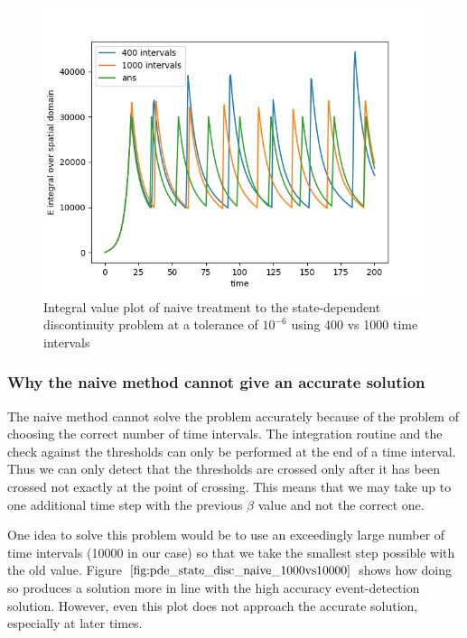 \documentclass{article}
\begin{document}
\begin{figure}[H]
\centering
\includegraphics[width=0.7\linewidth]{./figures/pde_state_disc_naive_400vs1000}
\caption{Integral value plot of naive treatment to the state-dependent discontinuity problem at a tolerance of $10^{-6}$ using 400 vs 1000 time intervals}
\label{fig:pde_state_disc_naive_400vs1000}
\end{figure}

\subsubsection{Why the naive method cannot give an accurate solution}
\label{subsubsection:pde_state_naive_always_inaccurate}
The naive method cannot solve the problem accurately because of the problem of choosing the correct number of time intervals. The integration routine and the check against the thresholds can only be performed at the end of a time interval. Thus we can only detect that the thresholds are crossed only after it has been crossed not exactly at the point of crossing. This means that we may take up to one additional time step with the previous $\beta$ value and not the correct one.

One idea to solve this problem would be to use an exceedingly large number of time intervals (10000 in our case) so that we take the smallest step possible with the old value. Figure $\ref{fig:pde_state_disc_naive_1000vs10000}$ shows how doing so produces a solution more in line with the high accuracy event-detection solution. However, even this plot does not approach the accurate solution, especially at later times. 
\end{document}

